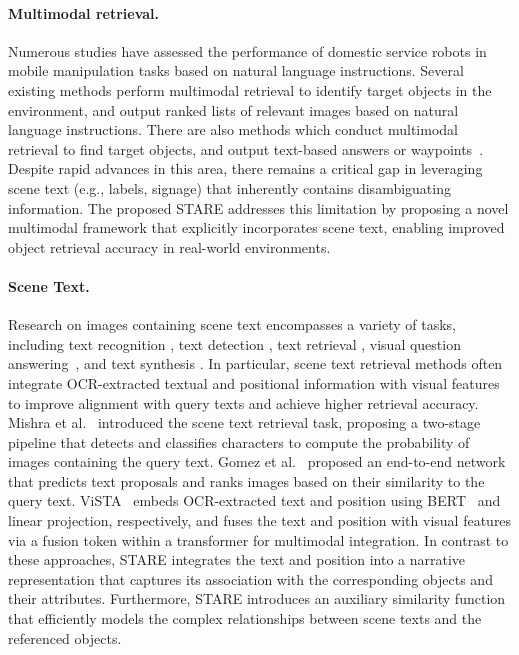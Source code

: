 \paragraph{Multimodal retrieval.}
Numerous studies \cite{Yenamandra2023HomeRobotOM, robocup} have assessed the performance of domestic service robots in mobile manipulation tasks based on natural language instructions.	 
Several existing methods \cite{nlmap, Sigurdsson2023RRExBoTRR, dm2rm, relaxformer} perform multimodal retrieval to identify target objects in the environment, and output ranked lists of relevant images based on natural language instructions.
There are also methods which conduct multimodal retrieval to find target objects, and output text-based answers or waypoints~\cite{xie2025embodiedrag}.
Despite rapid advances in this area, there remains a critical gap in leveraging scene text (e.g., labels, signage) that inherently contains disambiguating information. 
The proposed STARE addresses this limitation by proposing a novel multimodal framework that explicitly incorporates scene text, enabling improved object retrieval accuracy in real-world environments.

\paragraph{Scene Text.}
Research on images containing scene text encompasses a variety of tasks, including text recognition \cite{Zhao2023MultimodalIL, OTE}, text detection \cite{Liang_2024_CVPR, STEP, Zheng_2024_CVPR}, text retrieval \cite{Zeng2024FocusDA, Zheng_2024_CVPR, vista}, visual question answering~\cite{Biten2021LaTrLT, stvqa, Gao2020MultiModalGN}, and text synthesis \cite{Cui_2024_CVPR, Duan2024ODMAT, Santoso2023OnMS}.
In particular, scene text retrieval methods often integrate OCR-extracted textual and positional information with visual features to improve alignment with query texts and achieve higher retrieval accuracy.
Mishra et al.~\cite{ocrvqa} introduced the scene text retrieval task, proposing a two-stage pipeline that detects and classifies characters to compute the probability of images containing the query text. 
Gomez et al.~\cite{GomezMaflaECCV2018single} proposed an end-to-end network that predicts text proposals and ranks images based on their similarity to the query text.
ViSTA~\cite{vista} embeds OCR-extracted text and position using BERT~\cite{Devlin2019BERTPO} and linear projection, respectively, and fuses the text and position with visual features via a fusion token within a transformer for multimodal integration.
In contrast to these approaches, STARE integrates the text and position into a narrative representation that captures its association with the corresponding objects and their attributes.
Furthermore, STARE introduces an auxiliary similarity function that efficiently models the complex relationships between scene texts and the referenced objects.

